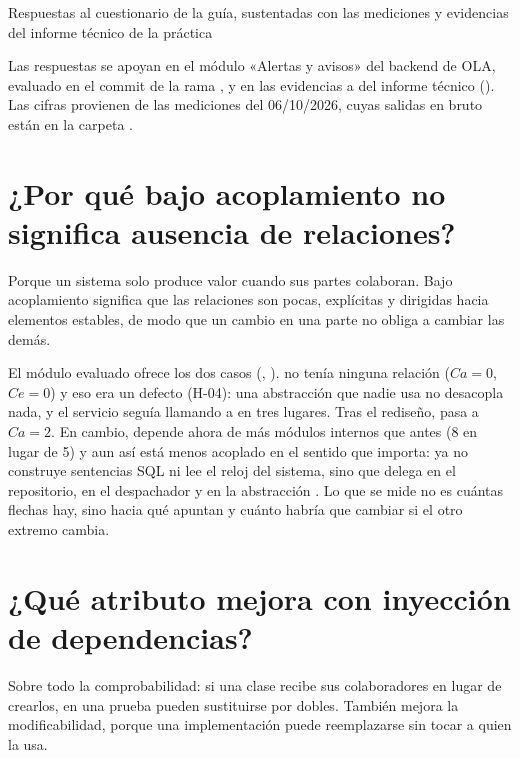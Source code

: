 \documentclass[11pt,a4paper]{article}
\begin{document}
        {Respuestas al cuestionario de la guía, sustentadas con las mediciones y evidencias del informe técnico de la práctica}

Las respuestas se apoyan en el módulo «Alertas y avisos» del backend de OLA, evaluado en el commit  de la rama , y en las evidencias  a  del informe técnico (). Las cifras provienen de las mediciones del 06/10/2026, cuyas salidas en bruto están en la carpeta .

\section{¿Por qué bajo acoplamiento no significa ausencia de relaciones?}

Porque un sistema solo produce valor cuando sus partes colaboran. Bajo acoplamiento significa que las relaciones son pocas, explícitas y dirigidas hacia elementos estables, de modo que un cambio en una parte no obliga a cambiar las demás.

El módulo evaluado ofrece los dos casos (, ).  no tenía ninguna relación ($Ca = 0$, $Ce = 0$) y eso era un defecto (H-04): una abstracción que nadie usa no desacopla nada, y el servicio seguía llamando a  en tres lugares. Tras el rediseño,  pasa a $Ca = 2$. En cambio,  depende ahora de más módulos internos que antes (8 en lugar de 5) y aun así está menos acoplado en el sentido que importa: ya no construye sentencias SQL ni lee el reloj del sistema, sino que delega en el repositorio, en el despachador y en la abstracción . Lo que se mide no es cuántas flechas hay, sino hacia qué apuntan y cuánto habría que cambiar si el otro extremo cambia.

\section{¿Qué atributo mejora con inyección de dependencias?}

Sobre todo la comprobabilidad: si una clase recibe sus colaboradores en lugar de crearlos, en una prueba pueden sustituirse por dobles. También mejora la modificabilidad, porque una implementación puede reemplazarse sin tocar a quien la usa.
\end{document}
